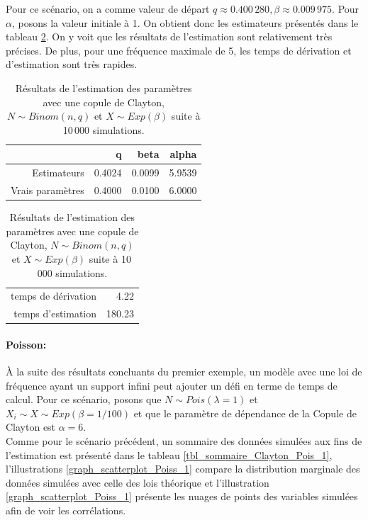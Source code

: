 \documentclass{article}
\begin{document}
	Pour ce scénario, on a comme valeur de départ $q \approx 0.400\,280, \beta \approx 0.009\,975$. Pour $\alpha$, posons la valeur initiale à 1. On obtient donc les estimateurs  présentés dans le tableau \ref{tbl_Clayton_Binom}. On y voit que les résultats de l'estimation sont relativement très précises. De plus, pour une fréquence maximale de 5, les temps de dérivation et d'estimation sont très rapides.
	
	\begin{table}[H]
		\centering
		\begin{tabular}{rrrr}
			\hline
			& q & beta & alpha \\ 
			\hline
			Estimateurs & 0.4024 & 0.0099 & 5.9539 \\ 
			Vrais paramètres & 0.4000 & 0.0100 & 6.0000 \\ 
			\hline
		\end{tabular}
		\begin{tabular}{rr}
			\hline
			&  \\ 
			\hline
			temps de dérivation & 4.22 \\ 
			temps d'estimation & 180.23 \\ 
			\hline
		\end{tabular}
		\caption[Estimations avec une copule de Clayton et $N\sim Binomiale$]{Résultats de l'estimation des paramètres avec une copule de Clayton, $N\sim Binom(n,q)$ et $X \sim Exp(\beta)$ suite à 10\,000 simulations.} 
		\label{tbl_Clayton_Binom}
	\end{table}
	
	\paragraph{Poisson:} À la suite des résultats concluants du premier exemple, un modèle avec une loi de fréquence ayant un support infini peut ajouter un défi en terme de temps de calcul. Pour ce scénario, posons que $N \sim Pois(\lambda=1)$ et $X_i \sim X \sim Exp(\beta=1/100)$ et que le paramètre de dépendance de la Copule de Clayton est $\alpha = 6$. \\
	
	Comme pour le scénario précédent, un sommaire des données simulées aux fins de l'estimation est présenté dans le tableau \ref{tbl_sommaire_Clayton_Pois_1}, l'illustrations \ref{graph_scatterplot_Poiss_1} compare la distribution marginale des données simulées avec celle des lois théorique et l'illustration \ref{graph_scatterplot_Poiss_1} présente les nuages de points des variables simulées afin de voir les corrélations.
	
\end{document}
